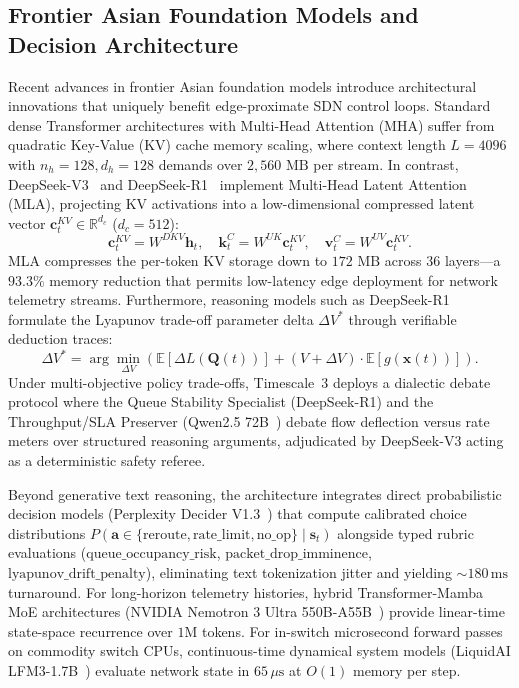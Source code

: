 \documentclass[conference]{IEEEtran}
\begin{document}
\subsection{Frontier Asian Foundation Models and Decision Architecture}
Recent advances in frontier Asian foundation models introduce architectural innovations that uniquely benefit edge-proximate SDN control loops. Standard dense Transformer architectures with Multi-Head Attention (MHA) suffer from quadratic Key-Value (KV) cache memory scaling, where context length $L=4096$ with $n_h=128, d_h=128$ demands over $2{,}560\text{ MB}$ per stream. In contrast, DeepSeek-V3~\cite{deepseek2024v3} and DeepSeek-R1~\cite{deepseek2025r1} implement Multi-Head Latent Attention (MLA), projecting KV activations into a low-dimensional compressed latent vector $\mathbf{c}_t^{KV} \in \mathbb{R}^{d_c}$ ($d_c = 512$):
\begin{equation}
\mathbf{c}_t^{KV} = W^{DKV} \mathbf{h}_t, \quad \mathbf{k}_t^C = W^{UK} \mathbf{c}_t^{KV}, \quad \mathbf{v}_t^C = W^{UV} \mathbf{c}_t^{KV}.
\end{equation}
MLA compresses the per-token KV storage down to $172\text{ MB}$ across 36 layers---a $\mathbf{93.3\%}$ memory reduction that permits low-latency edge deployment for network telemetry streams. Furthermore, reasoning models such as DeepSeek-R1 formulate the Lyapunov trade-off parameter delta $\Delta V^*$ through verifiable deduction traces:
\begin{equation}
\Delta V^* = \arg\min_{\Delta V} \left( \mathbb{E}\left[\Delta L(\mathbf{Q}(t))\right] + (V + \Delta V) \cdot \mathbb{E}\left[g(\mathbf{x}(t))\right] \right).
\end{equation}
Under multi-objective policy trade-offs, Timescale~3 deploys a dialectic debate protocol where the Queue Stability Specialist (DeepSeek-R1) and the Throughput/SLA Preserver (Qwen2.5 72B~\cite{qwen2024qwen25}) debate flow deflection versus rate meters over structured reasoning arguments, adjudicated by DeepSeek-V3 acting as a deterministic safety referee.

Beyond generative text reasoning, the architecture integrates direct probabilistic decision models (Perplexity Decider V1.3~\cite{perplexity2026decider}) that compute calibrated choice distributions $P(\mathbf{a} \in \{\text{reroute}, \text{rate\_limit}, \text{no\_op}\} \mid \mathbf{s}_t)$ alongside typed rubric evaluations ($\text{queue\_occupancy\_risk}$, $\text{packet\_drop\_imminence}$, $\text{lyapunov\_drift\_penalty}$), eliminating text tokenization jitter and yielding $\sim 180\,\text{ms}$ turnaround. For long-horizon telemetry histories, hybrid Transformer-Mamba MoE architectures (NVIDIA Nemotron 3 Ultra 550B-A55B~\cite{nvidia2026nemotron}) provide linear-time state-space recurrence over $1\text{M}$ tokens. For in-switch microsecond forward passes on commodity switch CPUs, continuous-time dynamical system models (LiquidAI LFM3-1.7B~\cite{liquid2026lfm}) evaluate network state in $65\,\mu\text{s}$ at $O(1)$ memory per step.
\end{document}
